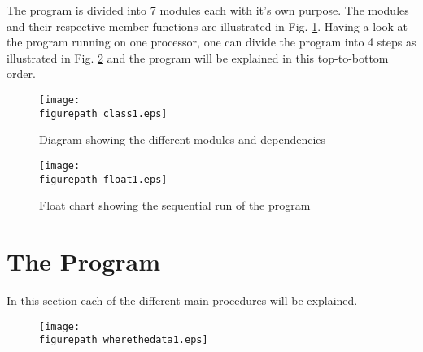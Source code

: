 The program is divided into 7 modules each with it's own purpose. The modules and their respective member functions are illustrated in Fig. \ref{fig:class1}. Having a look at the program running on one processor, one can divide the program into 4 steps as illustrated in Fig. \ref{fig:float1} and the program will be explained in this top-to-bottom order. 

\begin{figure}[h!] 
 \center 
 \texttt{[image: \\figurepath class1.eps]}
 \caption{ Diagram showing the different modules and dependencies \label{fig:class1}}
 \end{figure}

\begin{figure}[h!] 
 \center 
 \texttt{[image: \\figurepath float1.eps]}
 \caption{ Float chart showing the sequential run of the program \label{fig:float1}}
 \end{figure}


\section{The Program  }

In this section each of the different main procedures will be explained.


\begin{figure}[h!] 
 \center 
 \texttt{[image: \\figurepath wherethedata1.eps]}
 \caption{  \label{fig:}}
 \end{figure}



 















